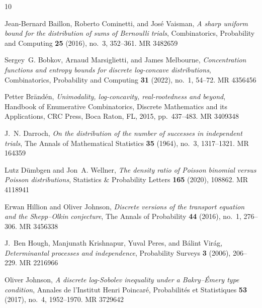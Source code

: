 \documentclass[ECP]{ejpecp}
\begin{document}
\providecommand{\bysame}{\leavevmode\hbox to3em{\hrulefill}\thinspace}
\providecommand{\MR}{\relax\ifhmode\unskip\space\fi MR }
\providecommand{\MRhref}[2]{%
  \href{http://www.ams.org/mathscinet-getitem?mr=#1}{#2}
}
\providecommand{\href}[2]{#2}
\begin{thebibliography}{10}

Jean-Bernard Baillon, Roberto Cominetti, and Jos{\'e} Vaisman, \emph{A sharp
  uniform bound for the distribution of sums of {Bernoulli} trials},
  Combinatorics, Probability and Computing \textbf{25} (2016), no.~3, 352--361.
  \MR{3482659}

Sergey~G. Bobkov, Arnaud Marsiglietti, and James Melbourne, \emph{Concentration
  functions and entropy bounds for discrete log-concave distributions},
  Combinatorics, Probability and Computing \textbf{31} (2022), no.~1, 54--72.
  \MR{4356456}

Petter Br{\"a}nd{\'e}n, \emph{Unimodality, log-concavity, real-rootedness and
  beyond}, Handbook of Enumerative Combinatorics, Discrete Mathematics and its
  Applications, CRC Press, Boca Raton, FL, 2015, pp.~437--483. \MR{3409348}

J.~N. Darroch, \emph{On the distribution of the number of successes in
  independent trials}, The Annals of Mathematical Statistics \textbf{35}
  (1964), no.~3, 1317--1321. \MR{164359}

Lutz D{\"u}mbgen and Jon~A. Wellner, \emph{The density ratio of {Poisson}
  binomial versus {Poisson} distributions}, Statistics \& Probability Letters
  \textbf{165} (2020), 108862. \MR{4118941}

Erwan Hillion and Oliver Johnson, \emph{Discrete versions of the transport
  equation and the {Shepp--Olkin} conjecture}, The Annals of Probability
  \textbf{44} (2016), no.~1, 276--306. \MR{3456338}

J.~Ben Hough, Manjunath Krishnapur, Yuval Peres, and B{\'a}lint Vir{\'a}g,
  \emph{Determinantal processes and independence}, Probability Surveys
  \textbf{3} (2006), 206--229. \MR{2216966}

Oliver Johnson, \emph{A discrete log-{Sobolev} inequality under a
  {Bakry--{\'E}mery} type condition}, Annales de l'Institut Henri Poincar{\'e},
  Probabilit{\'e}s et Statistiques \textbf{53} (2017), no.~4, 1952--1970.
  \MR{3729642}


\end{thebibliography}
\end{document}
